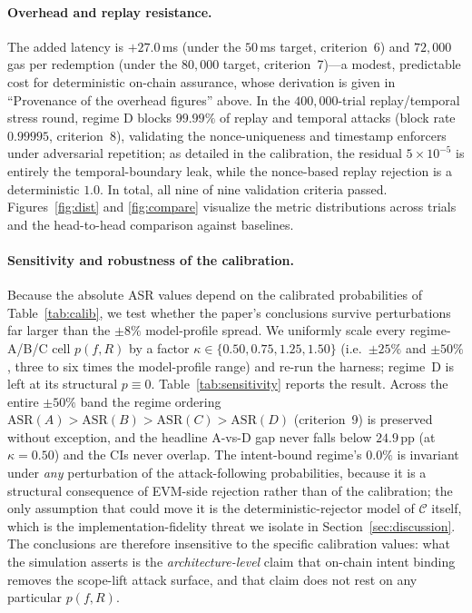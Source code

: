 \documentclass[10pt,twocolumn,letterpaper]{article}
\begin{document}
\paragraph{Overhead and replay resistance.} The added latency is $+27.0$\,ms (under the $50$\,ms target, criterion~6) and $72{,}000$ gas per redemption (under the $80{,}000$ target, criterion~7)---a modest, predictable cost for deterministic on-chain assurance, whose derivation is given in ``Provenance of the overhead figures'' above. In the $400{,}000$-trial replay/temporal stress round, regime D blocks $99.99\%$ of replay and temporal attacks (block rate $0.99995$, criterion~8), validating the nonce-uniqueness and timestamp enforcers under adversarial repetition; as detailed in the calibration, the residual $5\times10^{-5}$ is entirely the temporal-boundary leak, while the nonce-based replay rejection is a deterministic $1.0$. In total, all nine of nine validation criteria passed. Figures~\ref{fig:dist} and \ref{fig:compare} visualize the metric distributions across trials and the head-to-head comparison against baselines.

\paragraph{Sensitivity and robustness of the calibration.} Because the absolute ASR values depend on the calibrated probabilities of Table~\ref{tab:calib}, we test whether the paper's conclusions survive perturbations far larger than the $\pm8\%$ model-profile spread. We uniformly scale every regime-A/B/C cell $p(f,R)$ by a factor $\kappa\in\{0.50,0.75,1.25,1.50\}$ (i.e.\ $\pm25\%$ and $\pm50\%$, three to six times the model-profile range) and re-run the harness; regime~D is left at its structural $p\equiv0$. Table~\ref{tab:sensitivity} reports the result. Across the entire $\pm50\%$ band the regime ordering $\mathrm{ASR}(A)>\mathrm{ASR}(B)>\mathrm{ASR}(C)>\mathrm{ASR}(D)$ (criterion~9) is preserved without exception, and the headline A-vs-D gap never falls below $24.9$\,pp (at $\kappa=0.50$) and the CIs never overlap. The intent-bound regime's $0.0\%$ is invariant under \emph{any} perturbation of the attack-following probabilities, because it is a structural consequence of EVM-side rejection rather than of the calibration; the only assumption that could move it is the deterministic-rejector model of $\mathcal{C}$ itself, which is the implementation-fidelity threat we isolate in Section~\ref{sec:discussion}. The conclusions are therefore insensitive to the specific calibration values: what the simulation asserts is the \emph{architecture-level} claim that on-chain intent binding removes the scope-lift attack surface, and that claim does not rest on any particular $p(f,R)$.
\end{document}
